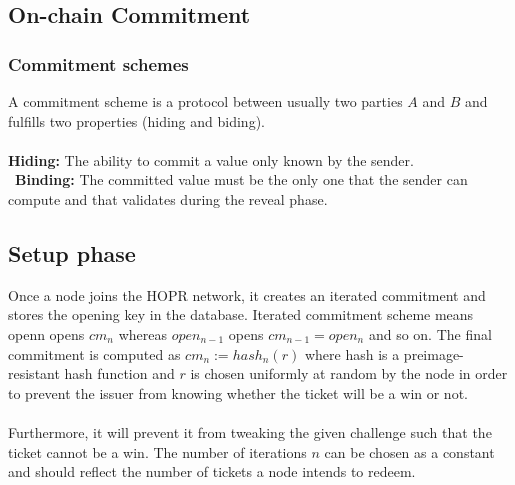 \subsection{On-chain Commitment}

\subsubsection*{Commitment schemes}
A commitment scheme is a protocol between usually two parties $A$ and $B$ and fulfills two properties (hiding and biding).
\\~\\\textbf{Hiding:} The ability to commit a value only known by the sender.
\\~\textbf{Binding:} The committed value must be the only one that the sender can compute and that validates during the reveal phase. 


\subsection{Setup phase}
Once a node joins the HOPR network, it creates an iterated commitment and stores the opening key in the database. 
Iterated commitment scheme means openn opens $cm_n$ whereas $open_{n-1}$ opens $cm_{n-1}=open_n$ and so on. 
\newline The final commitment is computed as $cm_n:= hash_n(r)$ where hash is a preimage-resistant hash function and 
$r$ is chosen uniformly at random by the node in order to prevent the issuer from knowing whether the ticket will be a win or not. 
\\~\\ Furthermore, it will prevent it from tweaking the given challenge such that the ticket cannot be a win.
The number of iterations $n$ can be chosen as a constant and should reflect the number of tickets a node intends to redeem.

